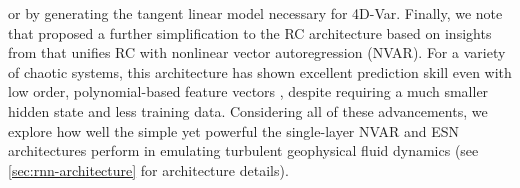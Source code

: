 or by generating the tangent linear model necessary for 4D-Var.
Finally, we note that \citet{gauthier_next_2021} proposed a further
simplification to the RC architecture based on insights from
\citet{bollt_explaining_2021} that unifies RC with nonlinear vector
autoregression (NVAR).
For a variety of chaotic systems, this architecture has shown excellent prediction skill
even with low order, polynomial-based feature vectors
\citep{chen_next_2022,barbosa_learning_2022,gauthier_next_2021}, despite requiring a much
smaller hidden state and less training data.
Considering all of these advancements, we explore how well the simple yet
powerful the single-layer NVAR and ESN architectures perform in emulating turbulent
geophysical fluid dynamics (see \cref{sec:rnn-architecture} for architecture
details).

